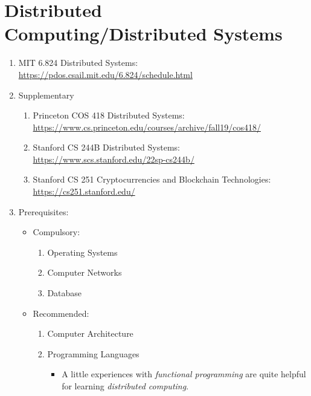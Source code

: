 \documentclass{article}
\begin{document}
\section{Distributed Computing/Distributed Systems}
\begin{enumerate}
    \item MIT 6.824 Distributed Systems:
    \href{https://pdos.csail.mit.edu/6.824/schedule.html}{https://pdos.csail.mit.edu/6.824/schedule.html}
    \item Supplementary
    \begin{enumerate}
        \item Princeton COS 418 Distributed Systems:\\
        \href{https://www.cs.princeton.edu/courses/archive/fall19/cos418/}{https://www.cs.princeton.edu/courses/archive/fall19/cos418/}
        \item Stanford CS 244B Distributed Systems:
        \href{https://www.scs.stanford.edu/22sp-cs244b/}{https://www.scs.stanford.edu/22sp-cs244b/}
        \item Stanford CS 251 Cryptocurrencies and Blockchain Technologies:\\
        \href{https://cs251.stanford.edu/}{https://cs251.stanford.edu/}
    \end{enumerate}
    
    \item Prerequisites:
    \begin{itemize}
        \item Compulsory:
        \begin{enumerate}
        \item Operating Systems
        \item Computer Networks
        \item Database        
        \end{enumerate}
        \item Recommended:
        \begin{enumerate}
        \item Computer Architecture
        \item Programming Languages
        \begin{itemize}
            \item A little experiences with \emph{functional programming} are quite helpful for learning \emph{distributed computing}.
        \end{itemize}
        \end{enumerate} 
    \end{itemize}
\end{enumerate}
\end{document}
